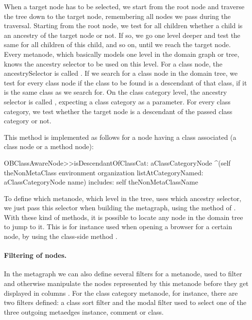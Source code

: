 \documentclass[a4paper,10pt,twoside]{book}
\begin{document}
When a target node has to be selected, we start from the root node and traverse the tree down to the target node, remembering all nodes we pass during the traversal. Starting from the root node, we test for all children whether a child is an ancestry of the target node or not. If so, we go one level deeper and test the same for all children of this child, and so on, until we reach the target node. Every metanode, which basically models one level in the domain graph or tree, knows the ancestry selector to be used on this level. For a class node, the ancestrySelector is called . If we search for a class node in the domain tree, we test for every class node if the class to be found is a descendant of that class, \ie if it is the same class as we search for. On the class category level, the ancestry selector is called , expecting a class category as a parameter. For every class category, we test whether the target node is a descendant of the passed class category or not. 

This method  is implemented as follows for a node having a class associated (\eg a class node or a method node):

\begin{code}{}
OBClassAwareNode>>isDescendantOfClassCat: aClassCategoryNode
    ^(self theNonMetaClass environment organization 
		listAtCategoryNamed: aClassCategoryNode name)
			includes: self theNonMetaClassName
\end{code}

To define which metanode, \ie which level in the tree, uses which ancestry selector, we just pass this selector when building the metagraph, using the method  of .
With these kind of methods, it is possible to locate any node in the domain tree to \eg jump to it. This is for instance used when opening a browser for a certain node, \eg by using the  class-side method .

\paragraph{Filtering of nodes.}

In the metagraph we can also define several filters for a metanode, used to filter and otherwise manipulate the nodes represented by this metanode before they get displayed in columns . For the class category metanode, for instance, there are two filters defined: a class sort filter and the modal filter used to select one of the three outgoing metaedges instance, comment or class. 
\end{document}
